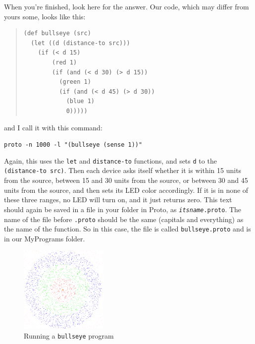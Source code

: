 \documentclass{article}
\newcommand\code[1]{\begin{center}\var{#1}\end{center}}
\newcommand\var[1]{{\tt #1}}
\begin{document}
When you're finished, look here for the answer.  Our code, which may
differ from yours some, looks like this:

\begin{quote}
\begin{verbatim}
(def bullseye (src)
  (let ((d (distance-to src)))
    (if (< d 15)
        (red 1)
        (if (and (< d 30) (> d 15))
          (green 1)
          (if (and (< d 45) (> d 30))
            (blue 1)
            0)))))
\end{verbatim}
\end{quote}

and I call it with this command:

\code{proto -n 1000 -l "(bullseye (sense 1))"}

Again, this uses the \var{let} and \var{distance-to} functions, and
sets \var{d} to the \var{(distance-to src)}.  Then each device asks
itself whether it is within 15 units from the source, between 15 and
30 units from the source, or between 30 and 45 units from the source,
and then sets its LED color accordingly.  If it is in none of these
three ranges, no LED will turn on, and it just returns zero.  This
text should again be saved in a file in your folder in Proto, as
\var{{\em itsname}.proto}.  The name of the file before \var{.proto}
should be the same (capitals and everything) as the name of the
function.  So in this case, the file is called \var{bullseye.proto}
and is in our MyPrograms folder.

\begin{figure}
  \vspace{-0.8cm}
  \includegraphics[width=0.38\textwidth]{figures/bullseye.png}
  \caption{Running a \var{bullseye} program}
  \vspace{-0.5cm}
  \label{f:bullseye}
\end{figure}
\end{document}
